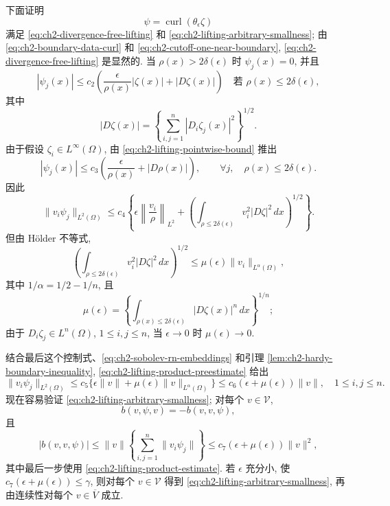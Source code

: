 \begin{Proof}
\hypertarget{chapter-02-page-134}{}
\begin{Proof}
下面证明
\[
\psi=\operatorname{curl}(\theta_\epsilon\zeta)
\]
满足 \eqref{eq:ch2-divergence-free-lifting} 和 \eqref{eq:ch2-lifting-arbitrary-smallness}; 由 \eqref{eq:ch2-boundary-data-curl} 和 \eqref{eq:ch2-cutoff-one-near-boundary}, \eqref{eq:ch2-divergence-free-lifting} 是显然的. 当 $\rho(x)>2\delta(\epsilon)$ 时 $\psi_j(x)=0$, 并且
\begin{equation}
|\psi_j(x)|\leq c_2\left(\frac\epsilon{\rho(x)}|\zeta(x)|+|D\zeta(x)|\right)
\quad\text{若 }\rho(x)\leq2\delta(\epsilon),
\label{eq:ch2-lifting-pointwise-bound}
\end{equation}
其中
\[
|D\zeta(x)|=\left\{\sum_{i,j=1}^{n}|D_i\zeta_j(x)|^2\right\}^{1/2}.
\]
由于假设 $\zeta_i\in L^\infty(\Omega)$, 由 \eqref{eq:ch2-lifting-pointwise-bound} 推出
\[
|\psi_j(x)|\leq c_3\left(\frac\epsilon{\rho(x)}+|D\rho(x)|\right),
\qquad\forall j,\quad\rho(x)\leq2\delta(\epsilon).
\]
因此
\begin{equation}
\lVert v_i\psi_j\rVert_{L^2(\Omega)}
\leq c_4\left\{\epsilon\left\lVert\frac{v_i}\rho\right\rVert_{L^2}
+\left(\int_{\rho\leq2\delta(\epsilon)}v_i^2|D\zeta|^2\,dx\right)^{1/2}\right\}.
\label{eq:ch2-lifting-product-preestimate}
\end{equation}
但由 Hölder 不等式,
\[
\left(\int_{\rho\leq2\delta(\epsilon)}v_i^2|D\zeta|^2\,dx\right)^{1/2}
\leq\mu(\epsilon)\lVert v_i\rVert_{L^\alpha(\Omega)},
\]
其中 $1/\alpha=1/2-1/n$, 且
\[
\mu(\epsilon)=
\left\{\int_{\rho(x)\leq2\delta(\epsilon)}|D\zeta(x)|^n\,dx\right\}^{1/n};
\]
由于 $D_i\zeta_j\in L^n(\Omega)$, $1\leq i,j\leq n$, 当 $\epsilon\to0$ 时 $\mu(\epsilon)\to0$.

结合最后这个控制式、\eqref{eq:ch2-sobolev-rn-embeddings} 和引理 \ref{lem:ch2-hardy-boundary-inequality}, \eqref{eq:ch2-lifting-product-preestimate} 给出
\begin{equation}
\lVert v_i\psi_j\rVert_{L^2(\Omega)}
\leq c_5\{\epsilon\lVert v\rVert+\mu(\epsilon)\lVert v\rVert_{L^\alpha(\Omega)}\}
\leq c_6(\epsilon+\mu(\epsilon))\lVert v\rVert,
\quad1\leq i,j\leq n.
\label{eq:ch2-lifting-product-estimate}
\end{equation}
现在容易验证 \eqref{eq:ch2-lifting-arbitrary-smallness}; 对每个 $v\in\mathcal V$,
\[
b(v,\psi,v)=-b(v,v,\psi),
\]
且
\begin{equation}
|b(v,v,\psi)|
\leq\lVert v\rVert
\left\{\sum_{i,j=1}^{n}\lVert v_i\psi_j\rVert\right\}
\leq c_7(\epsilon+\mu(\epsilon))\lVert v\rVert^2,
\label{eq:ch2-lifting-trilinear-estimate}
\end{equation}
其中最后一步使用 \eqref{eq:ch2-lifting-product-estimate}. 若 $\epsilon$ 充分小, 使 $c_7(\epsilon+\mu(\epsilon))\leq\gamma$, 则对每个 $v\in\mathcal V$ 得到 \eqref{eq:ch2-lifting-arbitrary-smallness}, 再由连续性对每个 $v\in\overline V$ 成立.
\end{Proof}
\end{Proof}

